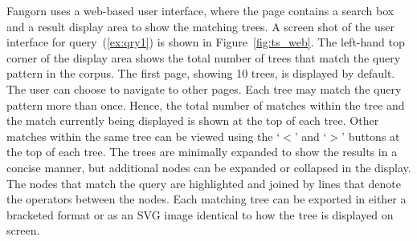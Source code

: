 \documentclass[12pt]{article}
\begin{document}
\begin{table}
\caption{Query operators and their symbols}
\label{tab:axis_ops}
\end{table}

Fangorn uses a web-based user interface, where the page
contains a search box and a result display area to show the matching
trees. A screen shot of the user interface for query~(\ref{ex:qry1}) 
is shown in Figure~\ref{fig:ts_web}.
The left-hand top corner of the display area shows the total
number of trees that match the query pattern in the corpus.  The first
page, showing 10 trees, is displayed by default. The user can choose
to navigate to other pages. Each tree may match the query pattern more
than once. Hence, the total number of matches within the tree and the
match currently being displayed is shown at the top of each
tree. Other matches within the same tree can be viewed using the
`$<$' and `$>$' buttons at the top of each tree. The trees are
minimally expanded to show the results in a concise manner, but
additional nodes can be expanded or collapsed in the display.  The
nodes that match the query are highlighted and joined by lines that
denote the operators between the nodes. Each matching tree can be
exported in either a bracketed format or as an SVG image identical
to how the tree is displayed on screen.
\end{document}
